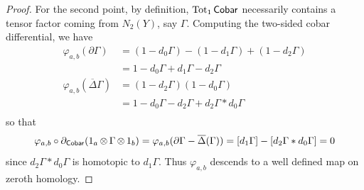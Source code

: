 \begin{prop}
\begin{proof}
        For the second point, by definition, $\operatorname{Tot}_1\operatorname{\mathsf{Cobar}}$ necessarily contains a tensor factor coming from $N_2(Y)$, say $\Gamma$. Computing the two-sided cobar differential, we have 
        \begin{equation*}
            \begin{split}  
            \varphi_{a,b}(\partial \Gamma) &= (1 - d_0\Gamma) - (1 - d_1\Gamma) + (1 - d_2\Gamma) \\
            &= 1 - d_0\Gamma + d_1\Gamma - d_2\Gamma \\
            \varphi_{a,b}(\overline{\Delta}\Gamma) &= (1 - d_2\Gamma)(1 - d_0\Gamma) \\
            &= 1 - d_0\Gamma - d_2\Gamma + d_2\Gamma * d_0\Gamma\\
            \end{split}
        \end{equation*}
        so that 
        \[\varphi_{a,b}\circ \partial_{\operatorname{\mathsf{Cobar}}}(1_a\operatorname{\otimes} \Gamma \operatorname{\otimes} 1_b) = \varphi_{a,b}(\partial\Gamma-\overline{\Delta}(\Gamma))=[d_1\Gamma] -[d_2\Gamma * d_0\Gamma] = 0\]
        since $d_2\Gamma * d_0\Gamma$ is homotopic to $d_1\Gamma$. Thus $\varphi_{a,b}$ descends to a well defined map on zeroth homology.
            

\end{proof}
\end{prop}

